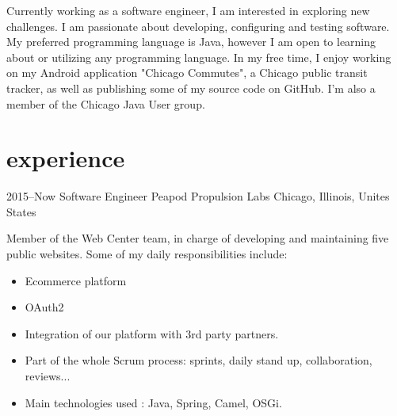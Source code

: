 \documentclass[]{friggeri-cv} %
\begin{document}
Currently working as a software engineer, I am interested in exploring new challenges. I am passionate about developing, configuring and testing software. My preferred programming language is Java, however I am open to learning about or utilizing any programming language. In my free time, I enjoy working on my Android application "Chicago Commutes", a Chicago public transit tracker, as well as publishing some of my source code on GitHub. I'm also a member of the Chicago Java User group.



\section{experience}


\begin{entrylist}

\entry
{2015--Now}
{Software Engineer} 
{Peapod Propulsion Labs}
{Chicago, Illinois, Unites States}
{Member of the Web Center team, in charge of developing and maintaining five public websites. Some of my daily responsibilities include:\\
\vspace{-4mm}
\begin{itemize}
	\item Ecommerce platform
	\item OAuth2
	\item Integration of our platform with 3rd party partners.
	\item Part of the whole Scrum process: sprints, daily stand up, collaboration, reviews...
	\item Main technologies used : Java, Spring, Camel, OSGi.
\end{itemize}}
\vspace{-7mm}

\end{entrylist}

\end{document}
